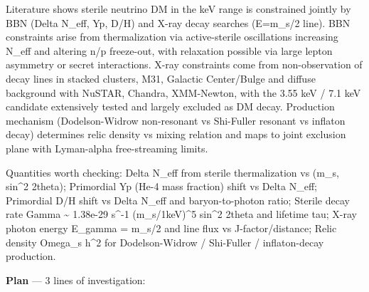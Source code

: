 \documentclass[11pt,a4paper]{article}
\begin{document}
Literature shows sterile neutrino DM in the keV range is constrained jointly by BBN (Delta N\_eff, Yp, D/H) and X-ray decay searches (E=m\_s/2 line). BBN constraints arise from thermalization via active-sterile oscillations increasing N\_eff and altering n/p freeze-out, with relaxation possible via large lepton asymmetry or secret interactions. X-ray constraints come from non-observation of decay lines in stacked clusters, M31, Galactic Center/Bulge and diffuse background with NuSTAR, Chandra, XMM-Newton, with the 3.55 keV / 7.1 keV candidate extensively tested and largely excluded as DM decay. Production mechanism (Dodelson-Widrow non-resonant vs Shi-Fuller resonant vs inflaton decay) determines relic density vs mixing relation and maps to joint exclusion plane with Lyman-alpha free-streaming limits.

Quantities worth checking: Delta N\_eff from sterile thermalization vs (m\_s, sin\textasciicircum{}2 2theta); Primordial Yp (He-4 mass fraction) shift vs Delta N\_eff; Primordial D/H shift vs Delta N\_eff and baryon-to-photon ratio; Sterile decay rate Gamma \textasciitilde{} 1.38e-29 s\textasciicircum{}-1 (m\_s/1keV)\textasciicircum{}5 sin\textasciicircum{}2 2theta and lifetime tau; X-ray photon energy E\_gamma = m\_s/2 and line flux vs J-factor/distance; Relic density Omega\_s h\textasciicircum{}2 for Dodelson-Widrow / Shi-Fuller / inflaton-decay production.

\textbf{Plan} --- 3 lines of investigation:
\end{document}
